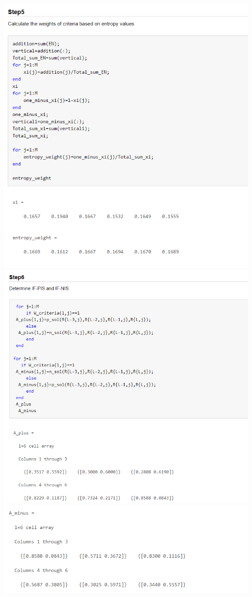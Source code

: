 \begin{flushleft}
\includegraphics[width = 16cm]{config/pictures/image15.png} 
\includegraphics[width = 15cm]{config/pictures/image16.png} 
\includegraphics[width = 14cm]{config/pictures/image17.png} 

\end{flushleft}
